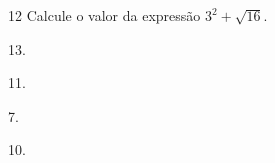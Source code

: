 





\num{12} Calcule o valor da expressão $3^{2} + \sqrt{16}$.

\begin{escolha}
\item 13.
\item 11.
\item 7.
\item 10.
\end{escolha}







